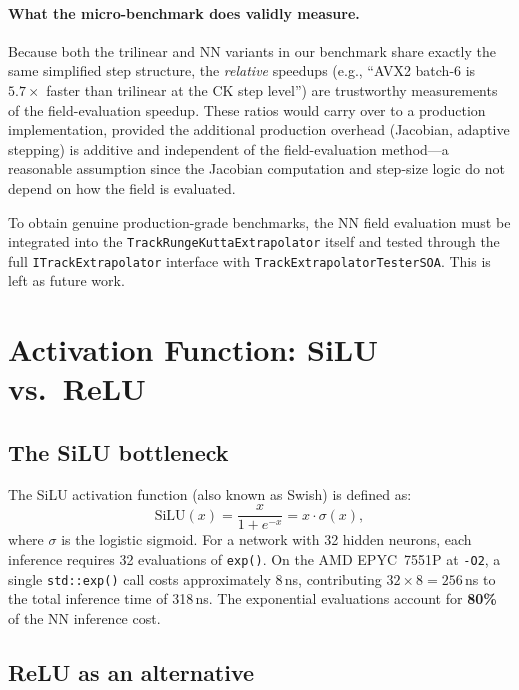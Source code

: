 \documentclass[11pt,a4paper]{article}
\begin{document}
\paragraph{What the micro-benchmark does validly measure.}
Because both the trilinear and NN variants in our benchmark share
exactly the same simplified step structure, the \emph{relative}
speedups (e.g., ``AVX2 batch-6 is $5.7\times$ faster than trilinear
at the CK step level'') are trustworthy measurements of the
field-evaluation speedup.  These ratios would carry over to a
production implementation, provided the additional production overhead
(Jacobian, adaptive stepping) is additive and independent of the
field-evaluation method---a reasonable assumption since the Jacobian
computation and step-size logic do not depend on how the field is
evaluated.

To obtain genuine production-grade benchmarks, the NN field evaluation
must be integrated into the \texttt{TrackRungeKuttaExtrapolator}
itself and tested through the full \texttt{ITrackExtrapolator}
interface with \texttt{TrackExtrapolatorTesterSOA}.  This is left
as future work.


\section{Activation Function: SiLU vs.\ ReLU}
\label{sec:activation}

\subsection{The SiLU bottleneck}

The SiLU activation function (also known as Swish) is defined as:
\begin{equation}
    \text{SiLU}(x) = \frac{x}{1 + e^{-x}} = x \cdot \sigma(x),
    \label{eq:silu}
\end{equation}
where $\sigma$ is the logistic sigmoid.  For a network with 32 hidden
neurons, each inference requires 32 evaluations of \texttt{exp()}.
On the AMD EPYC~7551P at \texttt{-O2}, a single \texttt{std::exp()}
call costs approximately 8\,ns, contributing $32 \times 8 = 256$\,ns
to the total inference time of 318\,ns.  The exponential evaluations
account for \textbf{80\%} of the NN inference cost.


\subsection{ReLU as an alternative}
\end{document}
